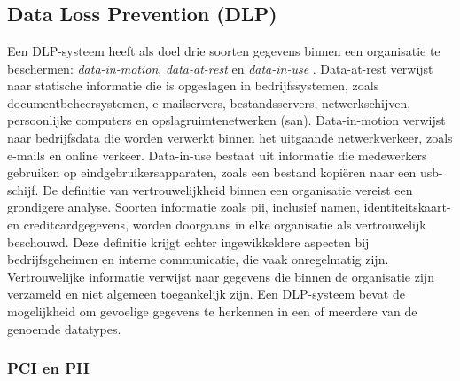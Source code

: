 \chapter{}%
\label{ch:stand-van-zaken}




\section{Data Loss Prevention (DLP)}%

Een DLP-systeem heeft als doel drie soorten gegevens binnen een organisatie te beschermen: \textit{data-in-motion}, \textit{data-at-rest} en \textit{data-in-use} . 
Data-at-rest verwijst naar statische informatie die is opgeslagen in bedrijfssystemen, zoals documentbeheersystemen, e-mailservers, bestandsservers, netwerkschijven, 
persoonlijke computers en opslagruimtenetwerken (\gls{san}). 
Data-in-motion verwijst naar bedrijfsdata die worden verwerkt binnen het uitgaande netwerkverkeer, zoals e-mails en online verkeer. 
Data-in-use bestaat uit informatie die medewerkers gebruiken op eindgebruikersapparaten, zoals een bestand kopiëren naar een \gls{usb}-schijf. 
De definitie van vertrouwelijkheid binnen een organisatie vereist een grondigere analyse. 
Soorten informatie zoals \gls{pii}, inclusief namen, identiteitskaart- en creditcardgegevens, worden doorgaans in elke organisatie als vertrouwelijk beschouwd.
Deze definitie krijgt echter ingewikkeldere aspecten bij bedrijfsgeheimen en interne communicatie, die vaak onregelmatig zijn. 
Vertrouwelijke informatie verwijst naar gegevens die binnen de organisatie zijn verzameld en niet algemeen toegankelijk zijn. 
Een DLP-systeem bevat de mogelijkheid om gevoelige gegevens te herkennen in een of meerdere van de genoemde datatypes.

\subsection{PCI en PII}

